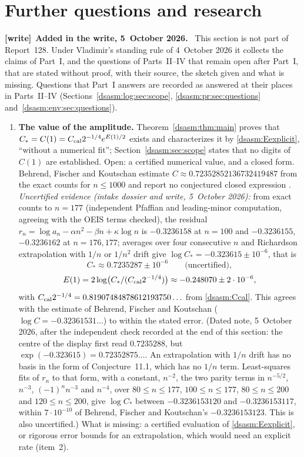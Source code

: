 \documentclass[11pt,letterpaper]{article}
\theoremstyle{remark}\newtheorem{remark}[theorem]{Remark}
\newenvironment{writenote}[1][]{\par\smallskip\begingroup\small
 \noindent\textbf{[write]}\if\relax\detokenize{#1}\relax\else~\textbf{#1.}\fi\ }%
 {\par\endgroup\smallskip}
\begin{document}
\section{Further questions and research}\label{dsasm:sec:further}
\begin{writenote}[Added in the write, 5~October 2026]
This section is not part of Report~128. Under Vladimir's standing rule of 4~October 2026 it collects the claims of Part~I, and the questions of Parts~II--IV that remain open after Part~I, that are stated without proof, with their source, the sketch given and what is missing. Questions that Part~I answers are recorded as answered at their places in Parts~II--IV (Sections~\ref{dsasm:log:sec:scope}, \ref{dsasm:pr:sec:questions} and~\ref{dsasm:env:sec:questions}).
\end{writenote}
\begin{enumerate}
\item \textbf{The value of the amplitude.} Theorem~\ref{dsasm:thm:main} proves that $C_*=C(1)=C_{\rm cal}2^{-1/4}e^{E(1)/2}$ exists and characterizes it by \eqref{dsasm:Eexplicit}, ``without a numerical fit''; Section~\ref{dsasm:sec:scope} states that no digits of $C(1)$ are established. Open: a certified numerical value, and a closed form. Behrend, Fischer and Koutschan estimate $C\approx0.72352852136732419487$ from the exact counts for $n\le1000$ and report no conjectured closed expression \cite[Conjecture~11.1]{bfk}. \emph{Uncertified evidence (intake dossier and write, 5~October 2026):} from exact counts to $n=177$ (independent Pfaffian and leading-minor computation, agreeing with the OEIS terms checked), the residual $r_n=\log a_n-\alpha n^2-\beta n+\kappa\log n$ is $-0.3236158$ at $n=100$ and $-0.3236155$, $-0.3236162$ at $n=176,177$; averages over four consecutive $n$ and Richardson extrapolation with $1/n$ or $1/n^2$ drift give $\log C_*=-0.323615\pm10^{-6}$, that is
\[
 C_*\approx0.7235287\pm10^{-6}\qquad\text{(uncertified)},
\]
\[
 E(1)=2\log\bigl(C_*/(C_{\rm cal}2^{-1/4})\bigr)\approx-0.248070\pm2\cdot10^{-6},
\]
with $C_{\rm cal}2^{-1/4}=0.81907484878612193750\ldots$ from \eqref{dsasm:Ccal}. This agrees with the estimate of Behrend, Fischer and Koutschan ($\log C=-0.32361531\ldots$) to within the stated error. (Dated note, 5~October 2026, after the independent check recorded at the end of this section: the centre of the display first read $0.7235288$, but $\exp(-0.323615)=0.72352875\ldots$. An extrapolation with $1/n$ drift has no basis in the form of Conjecture~11.1, which has no $1/n$ term. Least-squares fits of $r_n$ to that form, with a constant, $n^{-2}$, the two parity terms in $n^{-5/2}$, $n^{-3}$, $(-1)^nn^{-3}$ and $n^{-4}$, over $80\le n\le177$, $100\le n\le177$, $80\le n\le200$ and $120\le n\le200$, give $\log C_*$ between $-0.3236153120$ and $-0.3236153117$, within $7\cdot10^{-10}$ of Behrend, Fischer and Koutschan's $-0.3236153123$. This is also uncertified.) What is missing: a certified evaluation of \eqref{dsasm:Eexplicit}, or rigorous error bounds for an extrapolation, which would need an explicit rate (item~2).

\end{enumerate}
\end{document}
